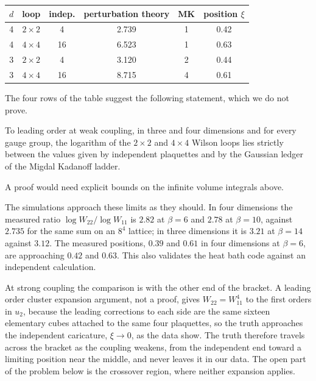 \begin{center}
\small
\begin{tabular}{cccccc}
\toprule
$d$ & loop & indep. & perturbation theory & MK & position $\xi$ \\ \midrule
4 & $2\times2$ & 4 & 2.739 & 1 & 0.42 \\
4 & $4\times4$ & 16 & 6.523 & 1 & 0.63 \\
3 & $2\times2$ & 4 & 3.120 & 2 & 0.44 \\
3 & $4\times4$ & 16 & 8.715 & 4 & 0.61 \\
\bottomrule
\end{tabular}
\end{center}

The four rows of the table suggest the following statement, which we do not prove.

\begin{conjecture}\label{prop:weaksandwich}
To leading order at weak coupling, in three and four dimensions and for every gauge group, the logarithm of the $2\times2$ and $4\times4$ Wilson loops lies strictly between the values given by independent plaquettes and by the Gaussian ledger of the Migdal Kadanoff ladder.
\end{conjecture}

A proof would need explicit bounds on the infinite volume integrals above.

The simulations approach these limits as they should. In four dimensions the measured ratio $\log W_{22}/\log W_{11}$ is $2.82$ at $\beta=6$ and $2.78$ at $\beta=10$, against $2.735$ for the same sum on an $8^4$ lattice; in three dimensions it is $3.21$ at $\beta=14$ against $3.12$. The measured positions, $0.39$ and $0.61$ in four dimensions at $\beta=6$, are approaching $0.42$ and $0.63$. This also validates the heat bath code against an independent calculation.

At strong coupling the comparison is with the other end of the bracket. A leading order cluster expansion argument, not a proof, gives $W_{22}=W_{11}^4$ to the first orders in $u_2$, because the leading corrections to each side are the same sixteen elementary cubes attached to the same four plaquettes, so the truth approaches the independent caricature, $\xi\to0$, as the data show. The truth therefore travels across the bracket as the coupling weakens, from the independent end toward a limiting position near the middle, and never leaves it in our data. The open part of the problem below is the crossover region, where neither expansion applies.

